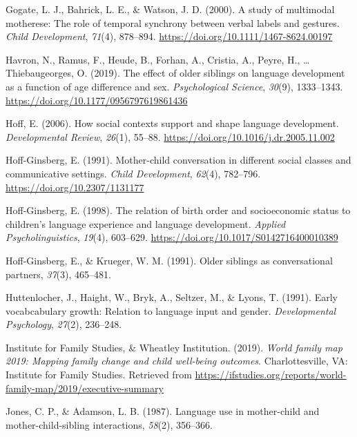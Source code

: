 \documentclass[
  english,
  man,floatsintext]{apa6}
\begin{document}
\leavevmode\hypertarget{ref-gogate_study_2000}{}%
Gogate, L. J., Bahrick, L. E., \& Watson, J. D. (2000). A study of multimodal motherese: The role of temporal synchrony between verbal labels and gestures. \emph{Child Development}, \emph{71}(4), 878--894. \url{https://doi.org/10.1111/1467-8624.00197}

\leavevmode\hypertarget{ref-havron_effect_2019}{}%
Havron, N., Ramus, F., Heude, B., Forhan, A., Cristia, A., Peyre, H., \ldots{} Thiebaugeorges, O. (2019). The effect of older siblings on language development as a function of age difference and sex. \emph{Psychological Science}, \emph{30}(9), 1333--1343. \url{https://doi.org/10.1177/0956797619861436}

\leavevmode\hypertarget{ref-hoff_how_2006}{}%
Hoff, E. (2006). How social contexts support and shape language development. \emph{Developmental Review}, \emph{26}(1), 55--88. \url{https://doi.org/10.1016/j.dr.2005.11.002}

\leavevmode\hypertarget{ref-hoff-ginsberg_mother-child_1991}{}%
Hoff-Ginsberg, E. (1991). Mother-child conversation in different social classes and communicative settings. \emph{Child Development}, \emph{62}(4), 782--796. \url{https://doi.org/10.2307/1131177}

\leavevmode\hypertarget{ref-hoff-ginsberg_relation_1998}{}%
Hoff-Ginsberg, E. (1998). The relation of birth order and socioeconomic status to children's language experience and language development. \emph{Applied Psycholinguistics}, \emph{19}(4), 603--629. \url{https://doi.org/10.1017/S0142716400010389}

\leavevmode\hypertarget{ref-hoff-ginsberg_older_1991}{}%
Hoff-Ginsberg, E., \& Krueger, W. M. (1991). Older siblings as conversational partners, \emph{37}(3), 465--481.

\leavevmode\hypertarget{ref-huttenlocher_early_1991}{}%
Huttenlocher, J., Haight, W., Bryk, A., Seltzer, M., \& Lyons, T. (1991). Early vocabcabulary growth: Relation to language input and gender. \emph{Developmental Psychology}, \emph{27}(2), 236--248.

\leavevmode\hypertarget{ref-institute_for_family_studies_world_2019}{}%
Institute for Family Studies, \& Wheatley Institution. (2019). \emph{World family map 2019: Mapping family change and child well-being outcomes}. Charlottesville, VA: Institute for Family Studies. Retrieved from \url{https://ifstudies.org/reports/world-family-map/2019/executive-summary}

\leavevmode\hypertarget{ref-jones_language_1987}{}%
Jones, C. P., \& Adamson, L. B. (1987). Language use in mother-child and mother-child-sibling interactions, \emph{58}(2), 356--366.
\end{document}
